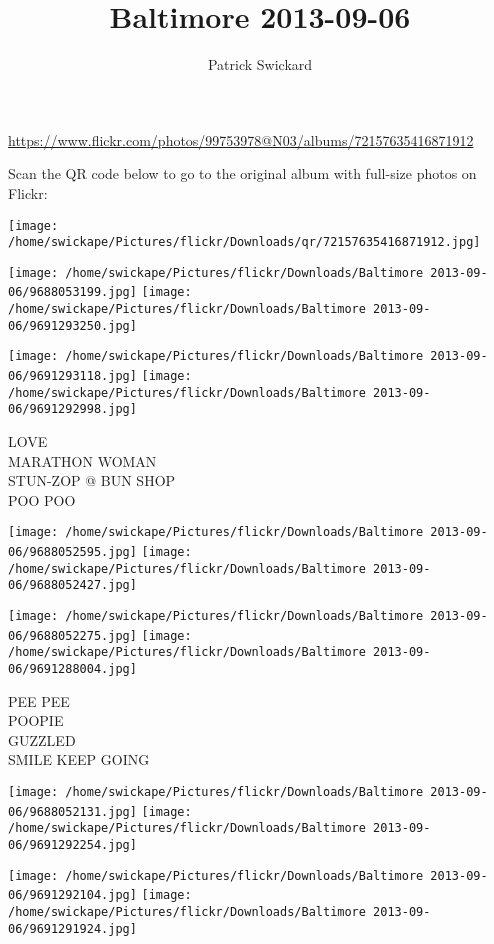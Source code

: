 \documentclass[10pt,letterpaper]{article}
\title{Baltimore 2013-09-06}
\author{Patrick Swickard}
\date{}
\begin{document}
\maketitle

\url{https://www.flickr.com/photos/99753978@N03/albums/72157635416871912}

Scan the QR code below to go to the original album with full-size photos on Flickr:

\texttt{[image: /home/swickape/Pictures/flickr/Downloads/qr/72157635416871912.jpg]}
\pagebreak

\texttt{[image: /home/swickape/Pictures/flickr/Downloads/Baltimore 2013-09-06/9688053199.jpg]}
\texttt{[image: /home/swickape/Pictures/flickr/Downloads/Baltimore 2013-09-06/9691293250.jpg]}

\texttt{[image: /home/swickape/Pictures/flickr/Downloads/Baltimore 2013-09-06/9691293118.jpg]}
\texttt{[image: /home/swickape/Pictures/flickr/Downloads/Baltimore 2013-09-06/9691292998.jpg]}

LOVE\\
MARATHON WOMAN\\
STUN{-}ZOP @ BUN SHOP\\
POO POO
\pagebreak

\texttt{[image: /home/swickape/Pictures/flickr/Downloads/Baltimore 2013-09-06/9688052595.jpg]}
\texttt{[image: /home/swickape/Pictures/flickr/Downloads/Baltimore 2013-09-06/9688052427.jpg]}

\texttt{[image: /home/swickape/Pictures/flickr/Downloads/Baltimore 2013-09-06/9688052275.jpg]}
\texttt{[image: /home/swickape/Pictures/flickr/Downloads/Baltimore 2013-09-06/9691288004.jpg]}

PEE PEE\\
POOPIE\\
GUZZLED\\
SMILE KEEP GOING
\pagebreak

\texttt{[image: /home/swickape/Pictures/flickr/Downloads/Baltimore 2013-09-06/9688052131.jpg]}
\texttt{[image: /home/swickape/Pictures/flickr/Downloads/Baltimore 2013-09-06/9691292254.jpg]}

\texttt{[image: /home/swickape/Pictures/flickr/Downloads/Baltimore 2013-09-06/9691292104.jpg]}
\texttt{[image: /home/swickape/Pictures/flickr/Downloads/Baltimore 2013-09-06/9691291924.jpg]}
\end{document}
